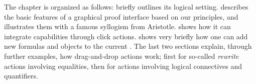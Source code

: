 The chapter is organized as follows:  briefly outlines its
logical setting.  describes the basic features of a graphical
proof interface based on our principles, and illustrates them with a famous
syllogism from Aristotle.  shows how it can integrate
 capabilities through click actions.  shows
very briefly how one can add new formulas and objects to the current . The
last two sections explain, through further examples, how drag-and-drop actions
work; first for so-called \emph{rewrite} actions involving equalities, then for
actions involving logical connectives and quantifiers.





